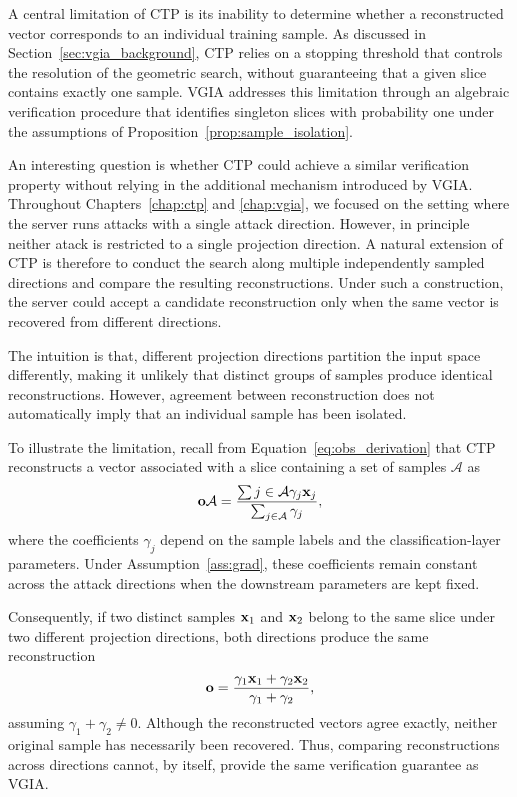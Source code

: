  A central limitation of CTP is its inability to determine whether a reconstructed vector corresponds to an individual training sample. As discussed in Section~\ref{sec:vgia_background}, CTP relies on a stopping threshold that controls the resolution of the geometric search, without guaranteeing that a given slice contains exactly one sample. VGIA addresses this limitation through an algebraic verification procedure that identifies singleton slices with probability one under the assumptions of Proposition~\ref{prop:sample_isolation}.

 An interesting question is whether CTP could achieve a similar verification property without relying in the additional mechanism introduced by VGIA. Throughout Chapters~\ref{chap:ctp} and \ref{chap:vgia}, we focused on the setting where the server runs attacks with a single attack direction. However, in principle neither atack is restricted to a single projection direction. A natural extension of CTP is therefore to conduct the search along multiple independently sampled directions and compare the resulting reconstructions. Under such a construction, the server could accept a candidate reconstruction only when the same vector is recovered from different directions.

 The intuition is that, different projection directions partition the input space differently, making it unlikely that distinct groups of samples produce identical reconstructions. However, agreement between reconstruction does not automatically imply that an individual sample has been isolated.

 To illustrate the limitation, recall from Equation~\ref{eq:obs_derivation} that CTP reconstructs a vector associated with a slice containing a set of samples $\mathcal A$ as
\begin{equation}
\mathbf{o}{\mathcal A}
=
\frac{
\sum{j\in\mathcal A}\gamma_j{\mathbf{x}}_j
}{
\sum_{j\in\mathcal A}\gamma_j
},
\end{equation}
where the coefficients $\gamma_j$ depend on the sample labels and the classification-layer parameters. Under Assumption~\ref{ass:grad}, these coefficients remain constant across the attack directions when the downstream parameters are kept fixed.

Consequently, if two distinct samples ${\mathbf{x}}_1$ and ${\mathbf{x}}_2$ belong to the same slice under two different projection directions, both directions produce the same reconstruction
\begin{equation}
\mathbf{o}
=
\frac{
\gamma_1{\mathbf{x}}_1+\gamma_2{\mathbf{x}}_2
}{
\gamma_1+\gamma_2
},
\end{equation}
assuming $\gamma_1+\gamma_2\neq0$. Although the reconstructed vectors agree exactly, neither original sample has necessarily been recovered. Thus, comparing reconstructions across directions cannot, by itself, provide the same verification guarantee as VGIA.


